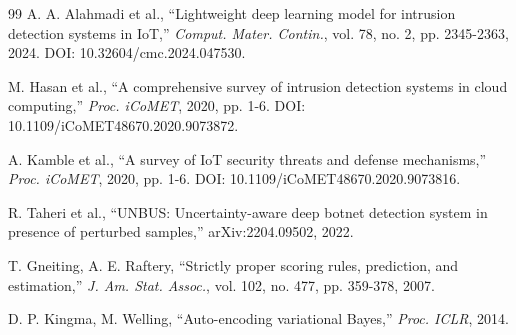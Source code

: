 \documentclass[review,12pt]{elsarticle}
\begin{document}
\begin{thebibliography}{99}
A. A. Alahmadi et al., ``Lightweight deep learning model for intrusion detection systems in IoT,'' \textit{Comput. Mater. Contin.}, vol. 78, no. 2, pp. 2345-2363, 2024. DOI: 10.32604/cmc.2024.047530.

M. Hasan et al., ``A comprehensive survey of intrusion detection systems in cloud computing,'' \textit{Proc. iCoMET}, 2020, pp. 1-6. DOI: 10.1109/iCoMET48670.2020.9073872.

A. Kamble et al., ``A survey of IoT security threats and defense mechanisms,'' \textit{Proc. iCoMET}, 2020, pp. 1-6. DOI: 10.1109/iCoMET48670.2020.9073816.

R. Taheri et al., ``UNBUS: Uncertainty-aware deep botnet detection system in presence of perturbed samples,'' arXiv:2204.09502, 2022.

T. Gneiting, A. E. Raftery, ``Strictly proper scoring rules, prediction, and estimation,'' \textit{J. Am. Stat. Assoc.}, vol. 102, no. 477, pp. 359-378, 2007.

D. P. Kingma, M. Welling, ``Auto-encoding variational Bayes,'' \textit{Proc. ICLR}, 2014.

\end{thebibliography}
\end{document}
